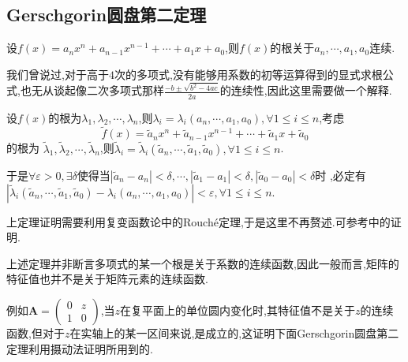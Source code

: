 \subsection{Gerschgorin圆盘第二定理}
\begin{formal}
\begin{theorem}[多项式系数]\label{thm:多项式系数}
    设$f\left(x\right)=a_nx^n+
    a_{n-1}x^{n-1}+\cdots+a_1x+a_0
    $,则$f\left(x\right)$的根关于$a_n,\cdots,a_1,a_0$连续.
\end{theorem}
\end{formal}
\begin{red}
\begin{remark}
    我们曾说过,对于高于$4$次的多项式,没有能够用系数的初等运算得到的显式求根公式,也无从谈起像二次多项式那样$\displaystyle
    \frac{
        -b\pm\sqrt{b^2-4ac}
    }{2a}$的连续性,因此这里需要做一个解释.

    设$f\left(x\right)$的根为$\lambda_1,\lambda_2,\cdots,\lambda_n$,则$\lambda_i=\lambda_i\left(
        a_n,\cdots,a_1,a_0
    \right),\forall 
    1\leqslant i\leqslant n
    $,考虑
    \[
    \widetilde{f}\left(x\right)=\widetilde{a}_nx^n+\widetilde{a}_{n-1}x^{n-1}+\cdots+\widetilde{a}_1x+\widetilde{a}_0
    \]的根为
    $\widetilde{\lambda}_1,\widetilde{\lambda}_2,\cdots,\widetilde{\lambda}_n$,则$\widetilde{\lambda}_i=\widetilde{\lambda}_i\left(
        \widetilde{a}_n,\cdots,\widetilde{a}_1,\widetilde{a}_0
    \right),\forall
    1\leqslant i\leqslant n$.
    
    于是$\forall \varepsilon >0,\exists \delta$使得当$\left|
        \widetilde{a}_n-a_n
    \right|<\delta
    ,\cdots,\left|
        \widetilde{a}_1-a_1
    \right|<\delta,\left|
        \widetilde{a}_0-a_0
    \right|<\delta$时
    ,必定有$\left|
        \widetilde{\lambda}_i\left(
            \widetilde{a}_n,\cdots,\widetilde{a}_1,\widetilde{a}_0
        \right)-\lambda_i\left(
            a_n,\cdots,a_1,a_0
        \right)
    \right|<\varepsilon,\forall 1\leqslant i\leqslant n$.
    
    上定理证明需要利用复变函数论中的\textup{Rouch\'e}定理,于是这里不再赘述.可参考\textup{\cite{蒋尔雄1978}}中的证明.
\end{remark}
\end{red}
\begin{red}
\begin{remark}
    上述定理并非断言多项式的某一个根是关于系数的连续函数,因此一般而言,矩阵的特征值也并不是关于矩阵元素的连续函数.
    
    例如$\bm{A}=\begin{pmatrix}
        0&z\\1&0
    \end{pmatrix}$,当$z$在复平面上的单位圆内变化时,其特征值不是关于$z$的连续函数,但对于$z$在实轴上的某一区间来说,是成立的,这证明下面\textup{Gerschgorin}圆盘第二定理利用摄动法证明所用到的.
\end{remark}
\end{red}
